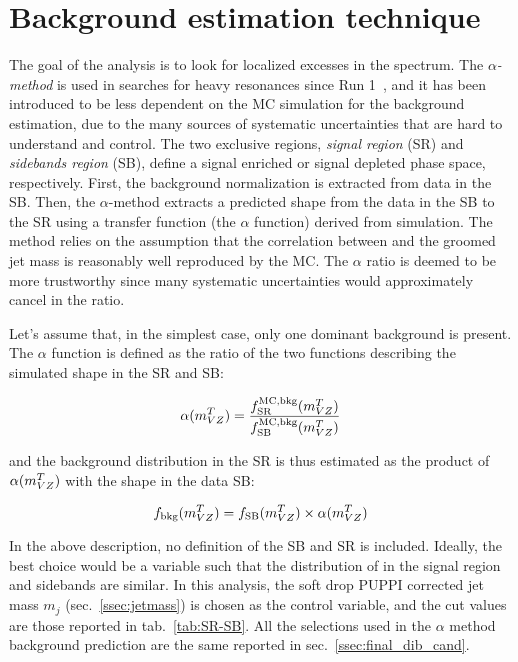 \section{Background estimation technique}
\label{sec:alpha}

The goal of the analysis is to look for localized excesses in the \mtVZ spectrum. The \emph{$\alpha$-method} is used in searches for heavy resonances since Run 1~\cite{Khachatryan:2015cwa}, and it has been introduced to be less dependent on the MC simulation for the background \mtVZ estimation, due to the many sources of systematic uncertainties that are hard to understand and control. The two exclusive regions, \emph{signal region} (SR) and \emph{sidebands region} (SB), define a signal enriched or signal depleted phase space, respectively. First, the background normalization is extracted from data in the SB. Then, the $\alpha$-method extracts a predicted shape from the data in the SB to the SR using a transfer function (the $\alpha$ function) derived from simulation. The method relies on the assumption that the correlation between \mtVZ and the groomed jet mass is reasonably well reproduced by the MC. The $\alpha$ ratio is deemed to be more trustworthy since many systematic uncertainties would approximately cancel in the ratio.

\noindent Let's assume that, in the simplest case, only one dominant background is present. The $\alpha$ function is defined as the ratio of the two functions describing the simulated \mtVZ shape in the SR and SB:

\begin{equation}
\alpha(m_{VZ}^T) = \frac{f_{\text{SR}}^{\text{MC,bkg}}(m_{VZ}^T)}{f_{\text{SB}}^{\text{MC,bkg}}(m_{VZ}^T)}
\end{equation}

\noindent and the background distribution in the SR is thus estimated as the product of  $\alpha(m_{VZ}^T)$ with the shape in the data SB:

\begin{equation}
f_{\text{bkg}}(m_{VZ}^T) = f_{\text{SB}}(m_{VZ}^T) \times \alpha(m_{VZ}^T)
\end{equation}

\noindent In the above description, no definition of the SB and SR is included. Ideally, the best choice would be a variable such that the distribution of \mtVZ in the signal region and sidebands are similar. In this analysis, the soft drop PUPPI corrected jet mass $m_j$ (sec.~\ref{ssec:jetmass}) is chosen as the control variable, and the cut values are those reported in tab.~\ref{tab:SR-SB}. All the selections used in the $\alpha$ method background prediction are the same reported in sec.~\ref{ssec:final_dib_cand}.

